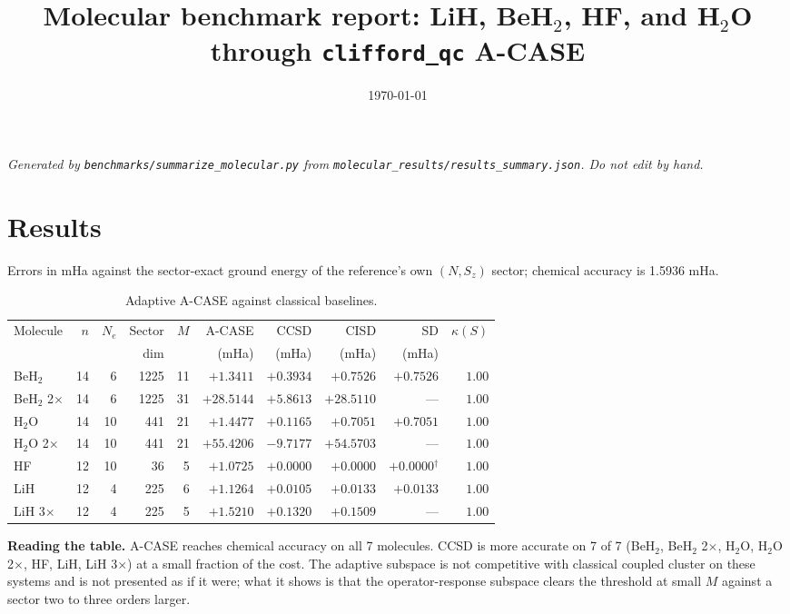 \documentclass[11pt]{article}
\title{Molecular benchmark report: LiH, BeH$_2$, HF, and H$_2$O\\ through \texttt{clifford\_qc} A-CASE}
\date{\today}
\begin{document}
\maketitle

\noindent\emph{Generated by \texttt{benchmarks/summarize\_molecular.py} from \texttt{molecular\_results/results\_summary.json}. Do not edit by hand.}

\section{Results}

Errors in mHa against the sector-exact ground energy of the reference's own $(N, S_z)$ sector; chemical accuracy is 1.5936 mHa.

\begin{table}[h]
\centering
\caption{Adaptive A-CASE against classical baselines.}
\begin{tabular}{lrrrrrrrrr}
\toprule
Molecule & $n$ & $N_e$ & Sector & $M$ & A-CASE & CCSD & CISD & SD & $\kappa(S)$ \\
 & & & dim & & (mHa) & (mHa) & (mHa) & (mHa) & \\
\midrule
BeH$_2$ & 14 & 6 & 1225 & 11 & $+1.3411$ & $+0.3934$ & $+0.7526$ & $+0.7526$ & $1.00$ \\
BeH$_2$ 2$\times$ & 14 & 6 & 1225 & 31 & $+28.5144$ & $+5.8613$ & $+28.5110$ & --- & $1.00$ \\
H$_2$O & 14 & 10 & 441 & 21 & $+1.4477$ & $+0.1165$ & $+0.7051$ & $+0.7051$ & $1.00$ \\
H$_2$O 2$\times$ & 14 & 10 & 441 & 21 & $+55.4206$ & $-9.7177$ & $+54.5703$ & --- & $1.00$ \\
HF & 12 & 10 & 36 & 5 & $+1.0725$ & $+0.0000$ & $+0.0000$ & $+0.0000$$^\dagger$ & $1.00$ \\
LiH & 12 & 4 & 225 & 6 & $+1.1264$ & $+0.0105$ & $+0.0133$ & $+0.0133$ & $1.00$ \\
LiH 3$\times$ & 12 & 4 & 225 & 5 & $+1.5210$ & $+0.1320$ & $+0.1509$ & --- & $1.00$ \\
\bottomrule
\end{tabular}
\end{table}

\noindent\textbf{Reading the table.} A-CASE reaches chemical accuracy on all 7 molecules. CCSD is more accurate on 7 of 7 (BeH$_2$, BeH$_2$ 2$\times$, H$_2$O, H$_2$O 2$\times$, HF, LiH, LiH 3$\times$) at a small fraction of the cost. The adaptive subspace is not competitive with classical coupled cluster on these systems and is not presented as if it were; what it shows is that the operator-response subspace clears the threshold at small $M$ against a sector two to three orders larger.
\end{document}

